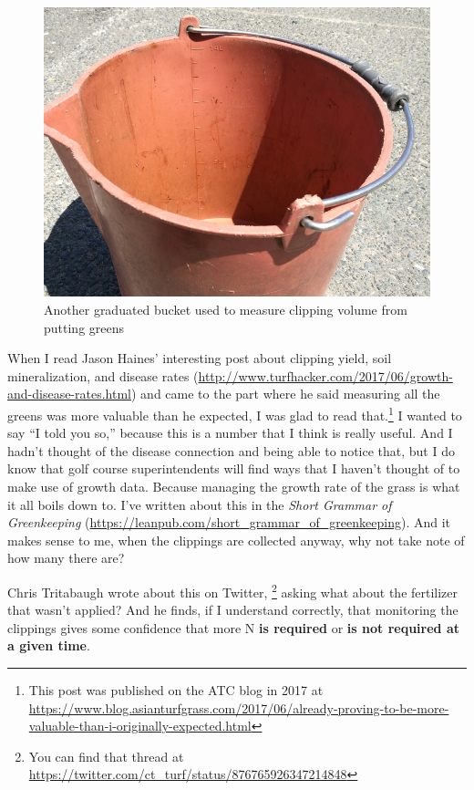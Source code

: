 \documentclass[12pt,b5,]{tufte-book}
\begin{document}
\begin{figure}
\centering
\includegraphics{img/b5-1.jpg}
\caption{Another graduated bucket used to measure clipping volume from putting greens}
\end{figure}

When I read Jason Haines' interesting post about clipping yield, soil mineralization, and disease rates (\url{http://www.turfhacker.com/2017/06/growth-and-disease-rates.html}) and came to the part where he said measuring all the greens was more valuable than he expected, I was glad to read that.\footnote{This post was published on the ATC blog in 2017 at \url{https://www.blog.asianturfgrass.com/2017/06/already-proving-to-be-more-valuable-than-i-originally-expected.html}} I wanted to say ``I told you so,'' because this is a number that I think is really useful. And I hadn't thought of the disease connection and being able to notice that, but I do know that golf course superintendents will find ways that I haven't thought of to make use of growth data. Because managing the growth rate of the grass is what it all boils down to. I've written about this in the \emph{Short Grammar of Greenkeeping} (\url{https://leanpub.com/short_grammar_of_greenkeeping}). And it makes sense to me, when the clippings are collected anyway, why not take note of how many there are?

Chris Tritabaugh wrote about this on Twitter, \footnote{You can find that thread at \url{https://twitter.com/ct_turf/status/876765926347214848}} asking what about the fertilizer that wasn't applied? And he finds, if I understand correctly, that monitoring the clippings gives some confidence that more N \textbf{is required} or \textbf{is not required at a given time}.
\end{document}
